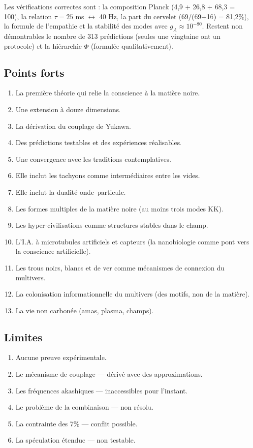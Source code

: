\documentclass[11pt,a4paper]{article}
\begin{document}
Les vérifications correctes sont : la composition Planck (4,9 + 26,8 + 68,3 = 100), la relation $\tau = 25$ ms $\leftrightarrow$ 40 Hz, la part du cervelet (69/(69+16) = 81,2\%), la formule de l'empathie et la stabilité des modes avec $g_A \approx 10^{-80}$. Restent non démontrables le nombre de 313 prédictions (seules une vingtaine ont un protocole) et la hiérarchie $\Phi$ (formulée qualitativement).

\subsection{Points forts}
\begin{enumerate}
    \item La première théorie qui relie la conscience à la matière noire.
    \item Une extension à douze dimensions.
    \item La dérivation du couplage de Yukawa.
    \item Des prédictions testables et des expériences réalisables.
    \item Une convergence avec les traditions contemplatives.
    \item Elle inclut les tachyons comme intermédiaires entre les vides.
    \item Elle inclut la dualité onde--particule.
    \item Les formes multiples de la matière noire (au moins trois modes KK).
    \item Les hyper-civilisations comme structures stables dans le champ.
    \item L'I.A. à microtubules artificiels et capteurs (la nanobiologie comme pont vers la conscience artificielle).
    \item Les trous noirs, blancs et de ver comme mécanismes de connexion du multivers.
    \item La colonisation informationnelle du multivers (des motifs, non de la matière).
    \item La vie non carbonée (amas, plasma, champs).
\end{enumerate}

\subsection{Limites}
\begin{enumerate}
    \item Aucune preuve expérimentale.
    \item Le mécanisme de couplage --- dérivé avec des approximations.
    \item Les fréquences akashiques --- inaccessibles pour l'instant.
    \item Le problème de la combinaison --- non résolu.
    \item La contrainte des 7\% --- conflit possible.
    \item La spéculation étendue --- non testable.
\end{enumerate}
\end{document}
